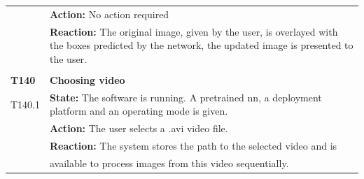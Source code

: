 \documentclass[parskip=full]{scrartcl}
\begin{document}
\begin{tabular}{p{2cm}p{12cm}}
& \textbf{Action:} No action required\\
& \textbf{Reaction:} The original image, given by the user, is overlayed with the boxes predicted by the network, the updated image is presented to the user.\\
& \\
\textbf{T140} & \textbf{Choosing video}\\
T140.1 & \textbf{State:} The software is running. A pretrained \gls{nn}, a deployment platform and an operating mode is given. \\
& \textbf{Action:} The user selects a .avi video file.\\
& \textbf{Reaction:} The system stores the path to the selected video and is \\
& available to process images from this video sequentially.\\
\end{tabular}
\newpage
\end{document}

